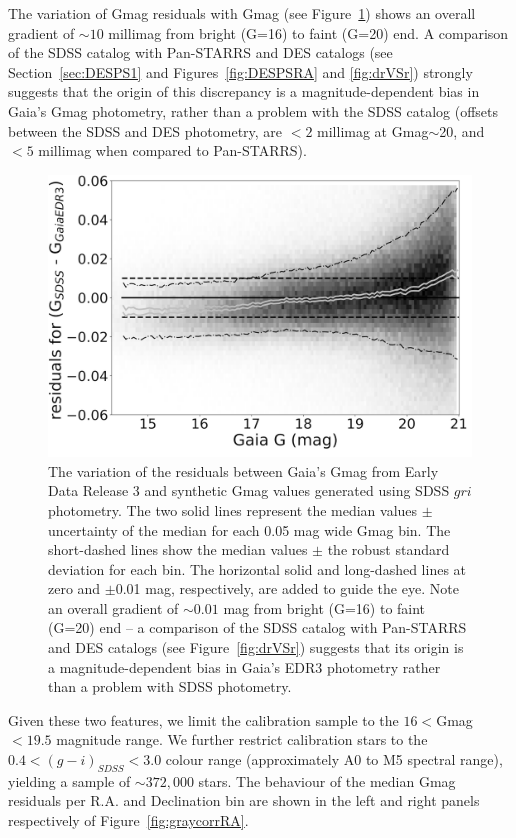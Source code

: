 \documentclass[fleqn,usenatbib]{mnras}
\begin{document}
The variation of Gmag residuals with Gmag (see Figure~\ref{fig:gaiaJump}) shows 
an overall gradient of $\sim10$ millimag from bright (G=16) to faint (G=20) end. 
A comparison of the SDSS catalog with Pan-STARRS and DES catalogs (see 
Section~\ref{sec:DESPS1} and Figures~\ref{fig:DESPSRA} and \ref{fig:drVSr}) strongly suggests that the
origin of this discrepancy is a magnitude-dependent bias in Gaia's Gmag photometry,
rather than a problem with the SDSS catalog (offsets between the SDSS and DES
photometry,  are $<2$ millimag at Gmag$\sim$20, and $<5$ millimag when
compared to Pan-STARRS). 


\begin{figure}
    \centering\includegraphics[width=0.95\columnwidth]{figures/GmagCorrectionTest_Gmag_Hess_lr.png} 
\caption{The variation of the residuals between Gaia's Gmag from Early Data Release 3
and synthetic Gmag values generated using SDSS $gri$ photometry. The two solid 
lines represent the median values $\pm$ uncertainty of the median for each
0.05 mag wide Gmag bin. The short-dashed lines show the median values $\pm$ 
the robust standard deviation for each bin. The horizontal solid and long-dashed 
lines at zero and $\pm$0.01 mag, respectively, are added to guide the eye.
Note an overall gradient of $\sim0.01$ mag from bright (G=16) to faint (G=20) 
end -- a comparison of the SDSS catalog with Pan-STARRS and DES catalogs (see 
Figure~\ref{fig:drVSr}) suggests that its origin is a magnitude-dependent bias in
 Gaia's EDR3 photometry rather than a problem with SDSS photometry.}
\label{fig:gaiaJump}
\end{figure}


Given these two features, we limit the calibration sample to the $16<$Gmag$<19.5$
magnitude range. We further restrict calibration stars to the $0.4 < (g-i)_{SDSS} < 3.0$ colour 
range (approximately A0 to M5 spectral range), yielding a sample of $\sim372,000$ stars. 
The behaviour of the median Gmag residuals per R.A. and Declination bin are shown in 
the left and right panels respectively of Figure~\ref{fig:graycorrRA}.
\end{document}
